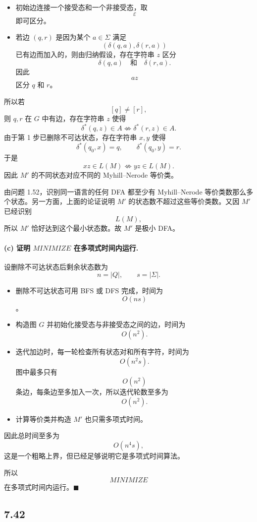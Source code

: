 \begin{answerred}
\begin{itemize}
  \item 初始边连接一个接受态和一个非接受态，取
  \[
  \varepsilon
  \]
  即可区分。
  \item 若边 $(q,r)$ 是因为某个 $a\in\Sigma$ 满足
  \[
  (\delta(q,a),\delta(r,a))
  \]
  已有边而加入的，则由归纳假设，存在字符串 $z$ 区分
  \[
  \delta(q,a)
  \quad\text{和}\quad
  \delta(r,a).
  \]
  因此
  \[
  az
  \]
  区分 $q$ 和 $r$。
\end{itemize}

所以若
\[
[q]\ne [r],
\]
则 $q,r$ 在 $G$ 中有边，存在字符串 $z$ 使得
\[
\delta^*(q,z)\in A
\not\Leftrightarrow
\delta^*(r,z)\in A.
\]
由于第 1 步已删除不可达状态，存在字符串 $x,y$ 使得
\[
\delta^*(q_0,x)=q,
\qquad
\delta^*(q_0,y)=r.
\]
于是
\[
xz\in L(M)
\not\Leftrightarrow
yz\in L(M).
\]
因此 $M'$ 的不同状态对应不同的 Myhill--Nerode 等价类。

由问题 1.52，识别同一语言的任何 DFA 都至少有 Myhill--Nerode 等价类数那么多个状态。另一方面，上面的论证说明 $M'$ 的状态数不超过这些等价类数。又因 $M'$ 已经识别
\[
L(M),
\]
所以 $M'$ 恰好达到这个最小状态数。故 $M'$ 是极小 DFA。

\paragraph{(c) 证明 \(MINIMIZE\) 在多项式时间内运行.}
设删除不可达状态后剩余状态数为
\[
n=|Q|,
\qquad
s=|\Sigma|.
\]

\begin{itemize}
  \item 删除不可达状态可用 BFS 或 DFS 完成，时间为
  \[
  O(ns)
  \]
  。
  \item 构造图 $G$ 并初始化接受态与非接受态之间的边，时间为
  \[
  O(n^2).
  \]
  \item 迭代加边时，每一轮检查所有状态对和所有字符，时间为
  \[
  O(n^2s).
  \]
  图中最多只有
  \[
  O(n^2)
  \]
  条边，每条边至多加入一次，所以迭代轮数至多为
  \[
  O(n^2).
  \]
  \item 计算等价类并构造 $M'$ 也只需多项式时间。
\end{itemize}

因此总时间至多为
\[
O(n^4s),
\]
这是一个粗略上界，但已经足够说明它是多项式时间算法。

\medskip
所以
\[
MINIMIZE
\]
在多项式时间内运行。$\blacksquare$

\end{answerred}
\subsection*{7.42}

